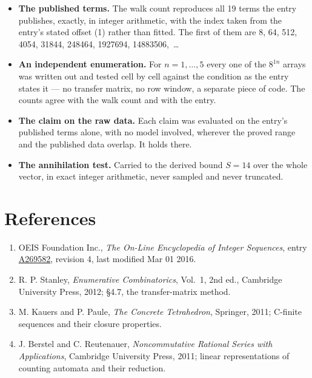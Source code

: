 \documentclass[11pt]{article}
\theoremstyle{definition}
\begin{document}
\begin{itemize}

\item {\bfseries The published terms.} The walk count reproduces all 19 terms the entry publishes, exactly, in integer arithmetic, with the index taken from the entry's stated offset (1) rather than fitted. The first of them are 8, 64, 512, 4054, 31844, 248464, 1927694, 14883506,~\dots

\item {\bfseries An independent enumeration.} For $n = 1,\dots,5$ every one of the $8^{1n}$ arrays was written out and tested cell by cell against the condition as the entry states it --- no transfer matrix, no row window, a separate piece of code. The counts agree with the walk count and with the entry.

\item {\bfseries The claim on the raw data.} Each claim was evaluated on the entry's published terms alone, with no model involved, wherever the proved range and the published data overlap. It holds there.

\item {\bfseries The annihilation test.} Carried to the derived bound $S = 14$ over the whole vector, in exact integer arithmetic, never sampled and never truncated.

\end{itemize}

\section{References}

\begin{enumerate}

\item OEIS Foundation Inc., \emph{The On-Line Encyclopedia of Integer Sequences}, entry \href{https://oeis.org/A269582}{A269582}, revision 4, last modified Mar 01 2016.

\item R. P. Stanley, \emph{Enumerative Combinatorics}, Vol.~1, 2nd ed., Cambridge University Press, 2012; \S4.7, the transfer-matrix method.

\item M. Kauers and P. Paule, \emph{The Concrete Tetrahedron}, Springer, 2011; C-finite sequences and their closure properties.

\item J. Berstel and C. Reutenauer, \emph{Noncommutative Rational Series with Applications}, Cambridge University Press, 2011; linear representations of counting automata and their reduction.

\end{enumerate}
\end{document}
